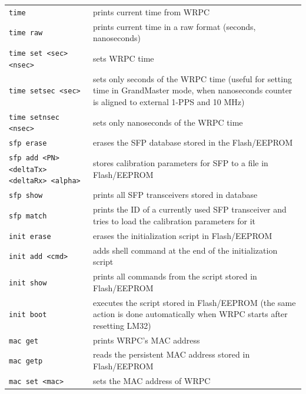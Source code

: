 \documentclass[a4paper, 12pt]{article}
\newcommand{\code}[1]{\texttt{#1}}
\begin{document}
\begin{longtable}{  p{7.5cm}  p{7cm} }
  \code{time} & prints current time from WRPC\\

  \code{time raw} &  prints current time in a raw format (seconds, nanoseconds)\\

  \code{time set <sec> <nsec>} & sets WRPC time\\

  \code{time setsec <sec>} & sets only seconds of the WRPC time
(useful for setting time in GrandMaster mode, when nanoseconds counter is
aligned to external 1-PPS and 10 MHz)\\

  \code{time setnsec <nsec>} & sets only nanoseconds of the WRPC time\\

  \code{sfp erase} & erases the SFP database stored in the Flash/EEPROM\\

  \code{sfp add <PN> <deltaTx> <deltaRx> <alpha>} & stores calibration
parameters for SFP to a file in Flash/EEPROM\\

  \code{sfp show} & prints all SFP transceivers stored in database\\

  \code{sfp match} & prints the ID of a currently used SFP
transceiver and tries to load the calibration parameters for it\\

  \code{init erase} & erases the initialization script in Flash/EEPROM \\

  \code{init add <cmd>} & adds shell command at the end of the
initialization script\\

  \code{init show} & prints all commands from the script stored in Flash/EEPROM\\

  \code{init boot} & executes the script stored in Flash/EEPROM (the same action
is done automatically when WRPC starts after resetting LM32)\\

  \code{mac get} & prints WRPC's MAC address\\

  \code{mac getp} & reads the persistent MAC address stored in Flash/EEPROM\\

  \code{mac set <mac>} & sets the MAC address of WRPC\\


\end{longtable}
\end{document}
